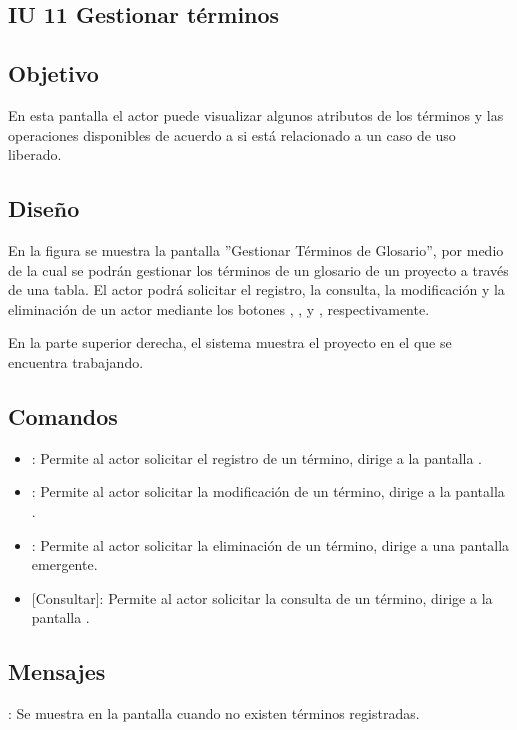 \subsection{IU 11 Gestionar términos}

\subsection{Objetivo}
	En esta pantalla el actor puede visualizar algunos atributos de los términos y las operaciones disponibles de acuerdo a si está relacionado a un caso de uso liberado.
\subsection{Diseño}
	En la figura  se muestra la pantalla ''Gestionar Términos de Glosario'', por medio de la cual se podrán gestionar los términos de un glosario de un proyecto a través de una tabla. El actor podrá solicitar el registro, la consulta, la modificación y la eliminación de un actor mediante los botones , , \editar y \eliminar, respectivamente.
	
	En la parte superior derecha, el sistema muestra el proyecto en el que se encuentra trabajando.

\subsection{Comandos}
\begin{itemize}
	\item {}: Permite al actor solicitar el registro de un término, dirige a la pantalla .
	\item \editar [Modificar]: Permite al actor solicitar la modificación de un término, dirige a la pantalla .
	\item \eliminar [Eliminar]: Permite al actor solicitar la eliminación de un término, dirige a una pantalla emergente.
	\item {} [Consultar]: Permite al actor solicitar la consulta de un término, dirige a la pantalla  .
\end{itemize}
\subsection{Mensajes}

\begin{Citemize}
	\item {}: Se muestra en la pantalla  cuando no existen términos registradas.
\end{Citemize}
